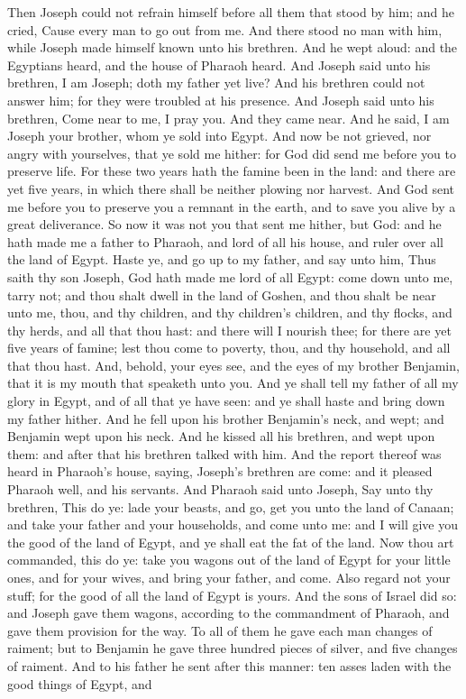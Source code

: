Then Joseph could not refrain himself before all them that stood by him; and he cried, Cause every man to go out from me. And there stood no man with him, while Joseph made himself known unto his brethren. And he wept aloud: and the Egyptians heard, and the house of Pharaoh heard. And Joseph said unto his brethren, I am Joseph; doth my father yet live? And his brethren could not answer him; for they were troubled at his presence. And Joseph said unto his brethren, Come near to me, I pray you. And they came near. And he said, I am Joseph your brother, whom ye sold into Egypt. And now be not grieved, nor angry with yourselves, that ye sold me hither: for God did send me before you to preserve life. For these two years hath the famine been in the land: and there are yet five years, in which there shall be neither plowing nor harvest. And God sent me before you to preserve you a remnant in the earth, and to save you alive by a great deliverance. So now it was not you that sent me hither, but God: and he hath made me a father to Pharaoh, and lord of all his house, and ruler over all the land of Egypt. Haste ye, and go up to my father, and say unto him, Thus saith thy son Joseph, God hath made me lord of all Egypt: come down unto me, tarry not; and thou shalt dwell in the land of Goshen, and thou shalt be near unto me, thou, and thy children, and thy children’s children, and thy flocks, and thy herds, and all that thou hast: and there will I nourish thee; for there are yet five years of famine; lest thou come to poverty, thou, and thy household, and all that thou hast. And, behold, your eyes see, and the eyes of my brother Benjamin, that it is my mouth that speaketh unto you. And ye shall tell my father of all my glory in Egypt, and of all that ye have seen: and ye shall haste and bring down my father hither. And he fell upon his brother Benjamin’s neck, and wept; and Benjamin wept upon his neck. And he kissed all his brethren, and wept upon them: and after that his brethren talked with him.  And the report thereof was heard in Pharaoh’s house, saying, Joseph’s brethren are come: and it pleased Pharaoh well, and his servants. And Pharaoh said unto Joseph, Say unto thy brethren, This do ye: lade your beasts, and go, get you unto the land of Canaan; and take your father and your households, and come unto me: and I will give you the good of the land of Egypt, and ye shall eat the fat of the land. Now thou art commanded, this do ye: take you wagons out of the land of Egypt for your little ones, and for your wives, and bring your father, and come. Also regard not your stuff; for the good of all the land of Egypt is yours.  And the sons of Israel did so: and Joseph gave them wagons, according to the commandment of Pharaoh, and gave them provision for the way. To all of them he gave each man changes of raiment; but to Benjamin he gave three hundred pieces of silver, and five changes of raiment. And to his father he sent after this manner: ten asses laden with the good things of Egypt, and 